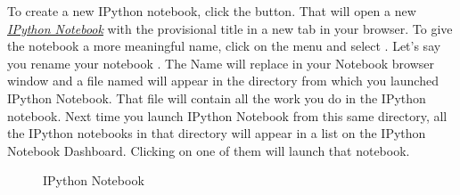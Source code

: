 \documentclass[letterpaper,10pt,english]{sphinxmanual}
\begin{document}
To create a new IPython notebook, click the  button.  That will open a new {\hyperref[apdx2/apdx2_ipynb:fig-ipynotebook]{\emph{IPython Notebook}}} with the provisional title  in a new tab in your browser.  To give the notebook a more meaningful name, click on the  menu and select .  Let's say you rename your notebook .  The Name  will replace  in your Notebook browser window and a file named  will appear in the directory from which you launched IPython Notebook.  That file will contain all the work you do in the IPython notebook.  Next time you launch IPython Notebook from this same directory, all the IPython notebooks in that directory will appear in a list on the IPython Notebook Dashboard.  Clicking on one of them will launch that notebook.
\begin{figure}[htbp]
\centering
\capstart

\caption{IPython Notebook}\label{apdx2/apdx2_ipynb:fig-ipynotebook}\end{figure}
\end{document}
